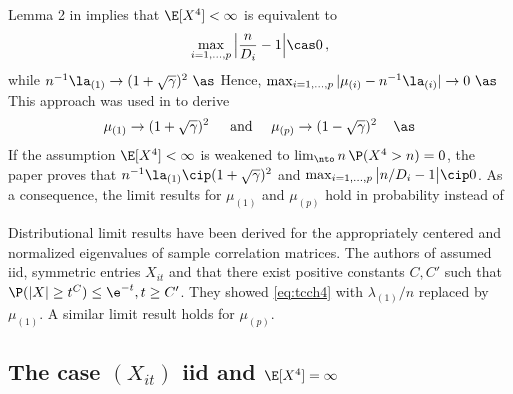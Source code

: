 Lemma 2 in \cite{bai:yin:1993} implies that $\E[X^4]<\infty$ is equivalent to
\begin{equation*}
\max_{i=1,\ldots,p} \Big| \frac{n}{D_i} -1 \Big| \cas 0\,,
\end{equation*}
while $n^{-1} \la_{(1)}\to (1+\sqrt{\gamma})^2~ \as$ Hence, $\max_{i=1,\ldots,p} |\mu_{(i)}- n^{-1} \la_{(i)}| \to 0~ \as$
This approach was used in \cite{jiang:2004,xiao:zhou:2010} to derive 
\begin{equation}\label{eq:drtgdrghdr1}
\mu_{(1)} \to (1+\sqrt{\gamma})^2\, \quad \text{ and } \quad  \mu_{(p)} \to (1-\sqrt{\gamma})^2\, \quad \as
\end{equation}
If the assumption $\E[X^4]<\infty$ is weakened to $\lim_{\nto} n\,\P(X^4> n)=0$, the paper \cite{bai:yin:1993} proves that $n^{-1} \la_{(1)}\cip (1+\sqrt{\gamma})^2$ and $\max_{i=1,\ldots,p} \big| n/D_i -1 \big| \cip 0$. As a consequence, the limit results for $\mu_{(1)}$ and $\mu_{(p)}$ hold in probability instead of \as
\par
Distributional limit results have been derived for the appropriately centered and normalized eigenvalues of sample correlation matrices. The authors of \cite{bao:pan:zhou:2012} assumed iid, symmetric entries $X_{it}$ and that there exist positive constants $C,C'$ such that $\P(|X|\ge t^C)\le \e^{-t}, t\ge C'$. They showed \eqref{eq:tcch4} with $\lambda_{(1)}/n$ replaced by $\mu_{(1)}$.
A similar limit result holds for $\mu_{(p)}$.

\subsection{The case $(X_{it})$ iid and $\E[X^4]=\infty$}

